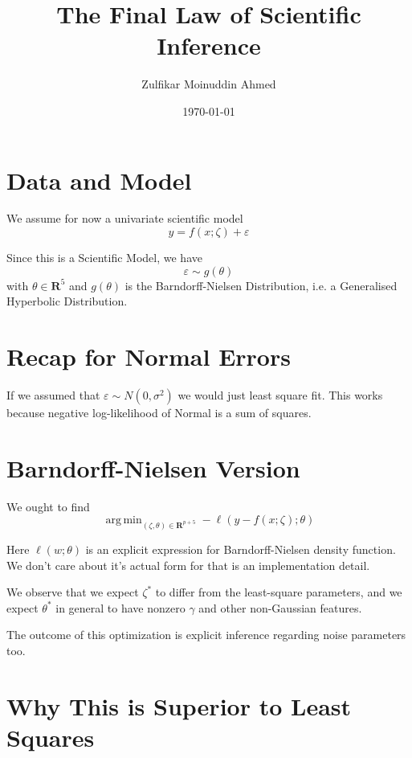 \documentclass{amsart}
\author{Zulfikar Moinuddin Ahmed}
\date{\today}
\DeclareMathOperator*{\argmin}{arg\,min}\title{The Final Law of Scientific Inference}
\begin{document}
\maketitle

\section{Data and Model}

We assume for now a univariate scientific model 
\begin{equation}
\label{generic}
y = f(x; \zeta) + \varepsilon
\end{equation}

Since this is a Scientific Model, we have
\[
\varepsilon \sim g(\theta)
\]
with $\theta \in \mathbf{R}^5$ and $g(\theta)$ is the Barndorff-Nielsen Distribution, i.e. a Generalised Hyperbolic Distribution.

\section{Recap for Normal Errors}

If we assumed that $\varepsilon \sim N(0,\sigma^2)$ we would just least square fit.  This works because negative log-likelihood of Normal is a sum of squares.

\section{Barndorff-Nielsen Version}

We ought to find
\begin{equation}
\label{optprob}
\argmin_{(\zeta,\theta)\in\mathbf{R}^{p+5}} -\ell( y-f(x;\zeta);\theta )
\end{equation}

Here $\ell( w; \theta)$ is an explicit expression for Barndorff-Nielsen density function. We don't care about it's actual form for that is an implementation detail.  

We observe that we expect $\zeta^*$ to differ from the least-square parameters, and we expect $\theta^*$ in general to have nonzero $\gamma$ and other non-Gaussian features.  

The outcome of this optimization is explicit inference regarding noise parameters too.

\section{Why This is Superior to Least Squares}
\end{document}
